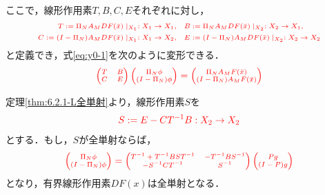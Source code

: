 \documentclass[11pt,a4paper,titlepage]{jsreport}
\theoremstyle{definition}
\providecommand{\DIFdel}[1]{{\protect\color{red} \scriptsize #1}} %
\begin{document}
\DIFdel{ここで，線形作用素$T,B,C,E$それぞれに対し，
}\begin{displaymath}
    \DIFdel{\label{eq:def_lo}
    \begin{split}
    T:= \Pi_N A_M DF(\bar{x}) \mid _{X_1}:X_1 \rightarrow X_1,\quad &
    B:= \Pi_N A_M DF(\bar{x}) \mid _{X_2}:X_2 \rightarrow X_1, \\
    C:= (I-\Pi_N) A_M DF(\bar{x}) \mid _{X_1}:X_1 \rightarrow X_2,\quad &
    E:= (I-\Pi_N) A_M DF(\bar{x}) \mid _{X_2}:X_2 \rightarrow X_2
  \end{split}
}\end{displaymath}%
\DIFdel{と定義でき，式\eqref{eq:y0-1}を次のように変形できる．
}\begin{displaymath}
  \DIFdel{\begin{pmatrix}
    T & B \\
    C & E
  \end{pmatrix}
  \begin{pmatrix}
    \Pi_N \phi \\
    (I -\Pi_N) \phi
  \end{pmatrix}
  =
  \begin{pmatrix}
    \Pi_N A_M F(\bar{x}) \\
    (I - \Pi_N) A_M F(\bar{x})
  \end{pmatrix}
}\end{displaymath}%

\DIFdel{定理\ref{thm:6.2.1-L全単射}より，線形作用素$S$を
}\begin{displaymath}
  \DIFdel{S:=E-CT^{-1}B:X_2 \rightarrow X_2
}\end{displaymath}%
\DIFdel{とする．もし，$S$が全単射ならば，
}\begin{displaymath}
  \DIFdel{\begin{pmatrix}
    \Pi_N \phi \\
    (I-\Pi_N)\phi
  \end{pmatrix}
  =
  \begin{pmatrix}
    T^{-1}+T^{-1}BST^{-1} & -T^{-1}BS^{-1} \\
    -S^{-1}CT^{-1} & S^{-1}
  \end{pmatrix}
  \begin{pmatrix}
    Pg \\
    (I-P)g
  \end{pmatrix}
}\end{displaymath}%
\DIFdel{となり，有界線形作用素$DF(x)$は全単射となる．
}%
\end{document}
